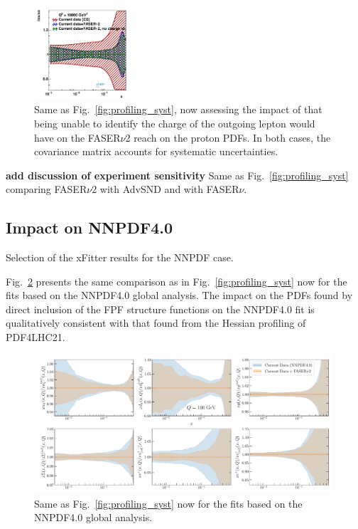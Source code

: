 \begin{figure}[t]
\includegraphics[width=0.32\textwidth]{plots/proton_fasernu2/nochargediscrimination/statOnly_FASERv2_q2_10000_pdf_s_ratio.pdf}
\caption{
Same as Fig.~\ref{fig:profiling_syst}, now assessing the impact of that being unable to identify
the charge of the outgoing lepton would have on the FASER$\nu$2 reach on the proton PDFs.
%
In both cases, the covariance matrix accounts for systematic uncertainties.
}
\label{fig:profiling_nochargediscrimination}
\end{figure}


{\bf add discussion of experiment sensitivity}
%
Same as Fig.~\ref{fig:profiling_syst} comparing FASER$\nu$2 with AdvSND and with FASER$\nu$.


\subsection{Impact on NNPDF4.0}
\label{sec:nnpdf40}

Selection of the {\sc\small xFitter} results for the NNPDF case.

Fig.~\ref{fig:nnpdf40_fasernu2_baseline} presents the same comparison
as in Fig.~\ref{fig:profiling_syst} now for
 the fits
 based on the NNPDF4.0 global analysis.
 The impact on the PDFs found by direct inclusion of the FPF structure
 functions on the NNPDF4.0 fit is qualitatively consistent with
 that found from the Hessian profiling of PDF4LHC21.

\begin{figure}[t]
\centering
\includegraphics[width=0.99\textwidth]{plots/FASERnu2-q100gev-ratios.pdf}
\caption{
  Same as Fig.~\ref{fig:profiling_syst} now for the fits
  based on the NNPDF4.0 global analysis.
%
}
\label{fig:nnpdf40_fasernu2_baseline}
\end{figure}
